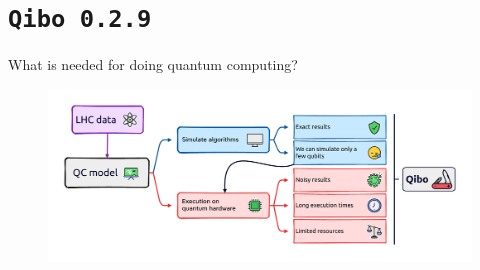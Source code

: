 \documentclass[aspectratio=169, 8pt, xcolor={svgnames}, hyperref={linkcolor=black}]{beamer}
\begin{document}
\section{\texttt{Qibo 0.2.9}}

\begin{frame}{What is needed for doing quantum computing?}
\begin{figure}
   \includegraphics[width=1\linewidth]{figures/qc_onchip.pdf}
\end{figure}  
\end{frame}
\end{document}
